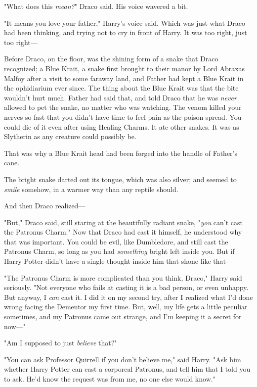 "What does this \emph{mean?}" Draco said. His voice wavered a bit.

"It means you love your father," Harry's voice said. Which was just what Draco
had been thinking, and trying not to cry in front of Harry. It was too right,
just too right---

Before Draco, on the floor, was the shining form of a snake that Draco
recognized; a Blue Krait, a snake first brought to their manor by Lord Abraxas
Malfoy after a visit to some faraway land, and Father had kept a Blue Krait in
the ophidiarium ever since. The thing about the Blue Krait was that the bite
wouldn't hurt much. Father had said that, and told Draco that he was
\emph{never} allowed to pet the snake, no matter who was watching. The venom
killed your nerves so fast that you didn't have time to feel pain as the poison
spread. You could die of it even after using Healing Charms. It ate other
snakes. It was as Slytherin as any creature could possibly be.

That was why a Blue Krait head had been forged into the handle of Father's cane.

The bright snake darted out its tongue, which was also silver; and seemed to
\emph{smile} somehow, in a warmer way than any reptile should.

And then Draco realized---

"But," Draco said, still staring at the beautifully radiant snake, "\emph{you}
can't cast the Patronus Charm." Now that Draco had cast it himself, he
understood why that was important. You could be evil, like Dumbledore, and
still cast the Patronus Charm, so long as you had \emph{something} bright left
inside you. But if Harry Potter didn't have a single thought inside him that
shone like that---

"The Patronus Charm is more complicated than you think, Draco," Harry said
seriously. "Not everyone who fails at casting it is a bad person, or even
unhappy. But anyway, I \emph{can} cast it. I did it on my second try, after I
realized what I'd done wrong facing the Dementor my first time. But, well, my
life gets a little peculiar sometimes, and my Patronus came out strange, and
I'm keeping it a secret for now\mbox{---}"

"Am I supposed to just \emph{believe} that?"

"You can ask Professor Quirrell if you don't believe me," said Harry. "Ask him
whether Harry Potter can cast a corporeal Patronus, and tell him that I told
you to ask. He'd know the request was from me, no one else would know."

